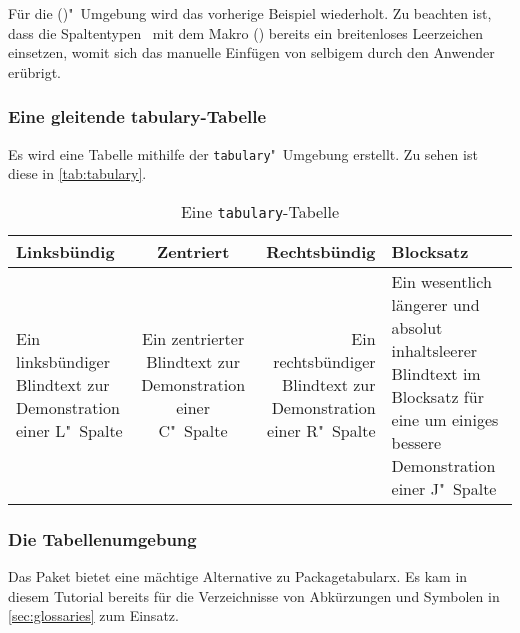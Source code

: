 \documentclass[%
  english,ngerman,%
  cdgeometry=no,DIV=12,%
  automark,%
  listof=toc,%
]{tudscrartcl}
\begin{document}
Für die ()"~Umgebung wird das vorherige 
Beispiel wiederholt. Zu beachten ist, dass die Spaltentypen~ mit 
dem Makro () bereits ein breitenloses 
Leerzeichen einsetzen, womit sich das manuelle Einfügen von selbigem durch den 
Anwender erübrigt.
%
\begin{Trunk+}
\subsubsection{Eine gleitende tabulary-Tabelle}
Es wird eine Tabelle mithilfe der \texttt{tabulary}"~Umgebung erstellt. 
Zu sehen ist diese in \autoref{tab:tabulary}. 

\end{Trunk+}
\begin{Trunk}
\begin{table}
\begin{tabulary}{\textwidth}{@{}LCRJ@{}}
\toprule
\textbf{Linksbündig} & \textbf{Zentriert} & 
\textbf{Rechtsbündig} & \textbf{Blocksatz} \tabularnewline\midrule
Ein linksbündiger Blindtext zur Demonstration einer L"~Spalte &
Ein zentrierter Blindtext zur Demonstration einer C"~Spalte &
Ein rechtsbündiger Blindtext zur Demonstration einer R"~Spalte &
Ein wesentlich längerer und absolut inhaltsleerer Blindtext im 
Blocksatz für eine um einiges bessere Demonstration einer J"~Spalte
\tabularnewline\bottomrule
\end{tabulary}
\caption{Eine \texttt{tabulary}-Tabelle}\label{tab:tabulary}
\end{table}

\end{Trunk}
\InputCode


\subsubsection{Die Tabellenumgebung }
\label{sec:tabu}%
%
Das Paket  bietet eine mächtige Alternative zu Package{tabularx}. 
Es kam in diesem Tutorial bereits für die Verzeichnisse von Abkürzungen und 
Symbolen in \autoref{sec:glossaries} zum Einsatz. 

%
\end{document}
